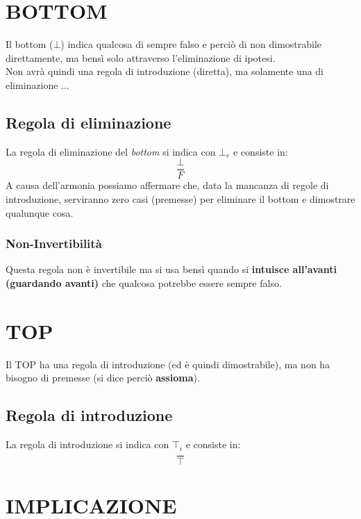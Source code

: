 \documentclass[12pt]{article}
\begin{document}
\section{BOTTOM}
\label{sec:bot}
Il bottom ($\bot$) indica qualcosa di sempre falso e perciò di non dimostrabile direttamente, ma bensì solo attraverso l'eliminazione di ipotesi.\\
Non avrà quindi una regola di introduzione (diretta), ma solamente una di eliminazione $\dots$
\subsection{Regola di eliminazione}
\label{ssec:bot_elim}
La regola di eliminazione del \textit{bottom} si indica con $\bot_e$ e consiste in:
\begin{equation}
    \dfrac{\bot}{F} \label{rule:bot_elim}
\end{equation}
A causa dell'armonia possiamo affermare che, data la mancanza di regole di introduzione, serviranno zero casi (premesse) per eliminare il bottom e dimostrare qualunque cosa.
\subsubsection{Non-Invertibilità}
\label{sssec:non_inv}
Questa regola non è invertibile ma si usa bensì quando si \textbf{intuisce all'avanti (guardando avanti)} che qualcosa potrebbe essere sempre falso.

\section{TOP}
\label{sec:top}
Il TOP ha una regola di introduzione (ed è quindi dimostrabile), ma non ha bisogno di premesse (si dice perciò \textbf{assioma}).
\subsection{Regola di introduzione}
\label{ssec:top_intro}
La regola di introduzione si indica con $\top_i$ e consiste in:
\begin{equation}
    \dfrac{}{\top}  \label{rule:top_intro}
\end{equation}
\pagebreak

\section{IMPLICAZIONE}
\label{sec:imply}
\end{document}
